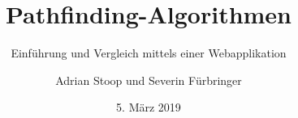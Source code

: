 \documentclass[professionalfont,serif,german]{beamer}
\title[Pathfinder-Vergleicher]{Pathfinding-Algorithmen}
\subtitle{Einführung und Vergleich mittels einer Webapplikation}
\author[A. Stoop, S. Fürbringer]{Adrian Stoop und Severin Fürbringer}
\institute[BMZ, EVT18a]{Berufsmaturitätsschule Zürich \\ \tiny{Technik,
Architektur, Life Sciences}}
\date{5. März 2019}
\begin{document}
\frame{\titlepage}




% 
% 
% 
% 
% 
% 
%
%
%       
% 
\end{document}
